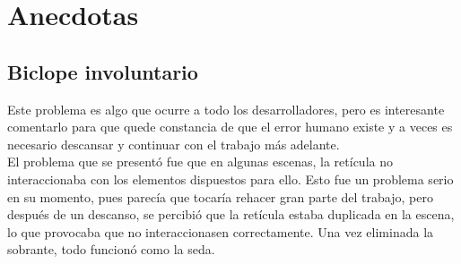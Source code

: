 \section{Anecdotas}

\subsection{Biclope involuntario}

\quad Este problema es algo que ocurre a todo los desarrolladores, pero es interesante comentarlo para que quede constancia de que el error humano existe y a veces es necesario descansar y continuar con el trabajo más adelante.\\

\quad El problema que se presentó fue que en algunas escenas, la retícula no interaccionaba con los elementos dispuestos para ello. Esto fue un problema serio en su momento, pues parecía que tocaría rehacer gran parte del trabajo, pero después de un descanso, se percibió que la retícula estaba duplicada en la escena, lo que provocaba que no interaccionasen correctamente. Una vez eliminada la sobrante, todo funcionó como la seda.\\

\newpage